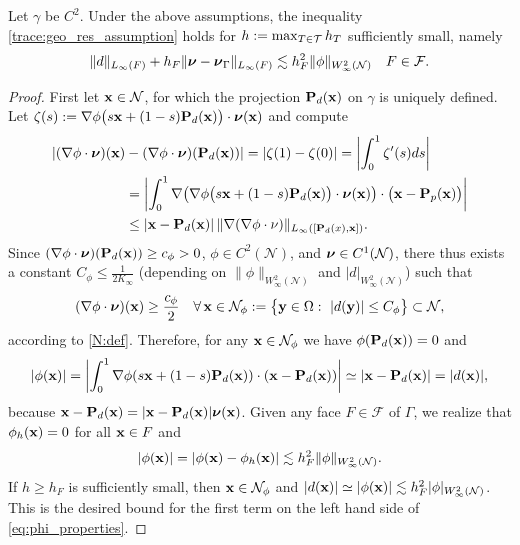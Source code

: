 \begin{lemma}\label{L:geo-res}
Let $\gamma$ be $C^2$. Under the above assumptions, the inequality \eqref{trace:geo_res_assumption} holds for $h:=\max_{T \in \mathcal{T}} h_T$ sufficiently small, namely
\begin{align}
\label{eq:phi_properties}
\|d\|_{L_\infty(F)}+ h_F \|{\boldsymbol \nu}-{\boldsymbol \nu}_\Gamma\|_{L_\infty(F)}
  \lesssim h_F^2 \|\phi\|_{W^2_\infty(\mathcal{N})}
\quad F \in \mathcal{F}.
\end{align}
\end{lemma}
\begin{proof}

First let ${\bf x} \in \mathcal{N}$, for which the projection ${\bf P}_d({\bf x})$ on $\gamma$ is uniquely defined. Let $\zeta(s) := \nabla \phi\big( s{\bf x} + (1-s) {\bf P}_d({\bf x}) \big)\cdot{\boldsymbol \nu}({\bf x})$ and compute
$$
\begin{aligned}
|(\nabla \phi \cdot {\boldsymbol \nu}) ({\bf x}) &- (\nabla \phi \cdot {\boldsymbol \nu}) ({\bf P}_d({\bf x}) )| =
|\zeta(1)-\zeta(0)| = \left |\int_0^1 \zeta'(s) ds \right |
\\
&= \left | \int_0^1 \nabla \big(\nabla\phi\big( s{\bf x} + (1-s) {\bf P}_d({\bf x}) \big)\cdot{\boldsymbol \nu}({\bf x}) \big) \cdot \big({\bf x}-{\bf P}_p({\bf x}) \big) \right |
\\ & \le  |{\bf x}- {\bf P}_d({\bf x})| \, \|\nabla (\nabla \phi \cdot \nu)\|_{L_\infty([{\bf P}_d(x), {\bf x}])}.
\end{aligned}
$$
%
Since $(\nabla \phi \cdot {\boldsymbol \nu}) ({\bf P}_d({\bf x})) \ge c_\phi>0$, $\phi \in C^2(\mathcal{N})$, and ${\boldsymbol \nu} \in C^1(\mathcal{N})$, there thus exists a constant $C_\phi\le\frac{1}{2K_\infty}$ (depending on $\|\phi\|_{W_\infty^2(\mathcal{N})}$ and $|d|_{W_\infty^2(\mathcal{N})}$) such that
%
\[
(\nabla \phi \cdot {\boldsymbol \nu})({\bf x}) \ge \frac{c_\phi}{2}
\quad \forall \,{\bf x} \in \mathcal{N}_{\phi}:=\big\{{\bf y}\in\Omega: ~ |d({\bf y})|\le C_\phi  \big\} \subset \mathcal{N},
\]
%
according to \eqref{N:def}. Therefore, for any ${\bf x} \in \mathcal{N}_\phi$ we have $\phi({\bf P}_d({\bf x}))=0$ and
%
$$
|\phi({\bf x})| = \left | \int_0^1 \nabla \phi(s{\bf x}+(1-s){\bf P}_d({\bf x})) \cdot ({\bf x}-{\bf P}_d({\bf x})) \right | \simeq |{\bf x} - {\bf P}_d({\bf x})| = |d({\bf x})|,
$$
%
because ${\bf x}-{\bf P}_d({\bf x}) = |{\bf x}-{\bf P}_d({\bf x})| {\boldsymbol \nu}({\bf x})$. Given any face $F \in \mathcal{F}$ of $\Gamma$, we realize that $\phi_h({\bf x})=0$ for all ${\bf x}\in F$ and
%
\[
|\phi({\bf x})| = |\phi({\bf x})-\phi_h({\bf x})| \lesssim h_F^2 \|\phi\|_{W^2_\infty(\mathcal{N})}.
\]
%
If $h\ge h_F$ is sufficiently small, then ${\bf x}\in\mathcal{N}_\phi$ and $|d({\bf x})| \simeq |\phi({\bf x})| \lesssim h_F^2|\phi|_{W^2_\infty(\mathcal{N})}$. This is the desired bound for the first term on the left hand side of \eqref{eq:phi_properties}.


\end{proof}
